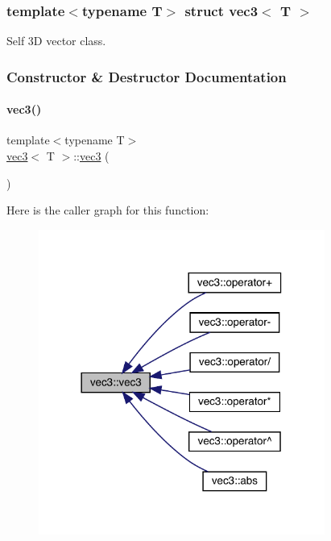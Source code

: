 \subsubsection*{template$<$typename T$>$\newline
struct vec3$<$ T $>$}

Self 3D vector class. 

\subsubsection{Constructor \& Destructor Documentation}
\mbox{\label{structvec3_afb7342872bc442bf0da6a7da1671e77e}} 
\paragraph{\texorpdfstring{vec3()}{vec3()}\hspace{0.1cm}{\footnotesize\ttfamily [1/3]}}
{\footnotesize\ttfamily template$<$typename T$>$ \\
\mbox{\hyperlink{structvec3}{vec3}}$<$ T $>$\+::\mbox{\hyperlink{structvec3}{vec3}} (\begin{DoxyParamCaption}{ }\end{DoxyParamCaption})\hspace{0.3cm}{\ttfamily [inline]}}

Here is the caller graph for this function\+:\nopagebreak
\begin{figure}[H]
\begin{center}
\leavevmode
\includegraphics[width=266pt]{structvec3_afb7342872bc442bf0da6a7da1671e77e_icgraph}
\end{center}
\end{figure}
\mbox{\label{structvec3_a9cdcc79d7383d2676ae1f5701c481607}} 
